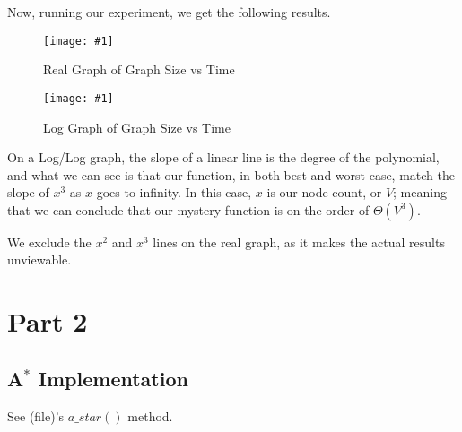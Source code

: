 \documentclass{article}
\newcommand{\figureInsetScaled}[3]
{
    \FloatBarrier{}
    \begin{figure}[ht!]
        \centering
        \texttt{[image: \#1]}
        \caption{#2}
    \end{figure}
    \FloatBarrier{}
}
\begin{document}
Now, running our experiment, we get the following results.

\figureInsetScaled{images/part1/mystery_real.png}{Real Graph of Graph Size vs Time}{0.5}
\figureInsetScaled{images/part1/mystery_graph.png}{Log Graph of Graph Size vs Time}{0.5}

 On a Log/Log graph, the slope of a linear line is the degree of the polynomial, and what we can see is that our function, in both best and worst case, match the slope of $x^3$ as $x$ goes to infinity. In this case, $x$ is our node count, or $V$; meaning that we can conclude that our mystery function is on the order of $\Theta(V^3)$.

We exclude the $x^2$ and $x^3$ lines on the real graph, as it makes the actual results unviewable.

\newpage
\section{Part 2}
\subsection{A$^{*}$ Implementation}
    See (file)'s $a\_star()$ method.
    
\end{document}
